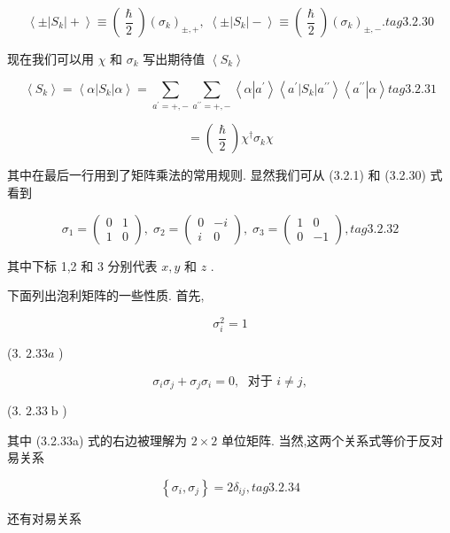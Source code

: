 $$
\left\langle {\pm \left| {S}_{k}\right| + }\right\rangle \equiv \left( \frac{\hslash }{2}\right) {\left( {\sigma }_{k}\right) }_{\pm , + },\;\left\langle {\pm \left| {S}_{k}\right| - }\right\rangle \equiv \left( \frac{\hslash }{2}\right) {\left( {\sigma }_{k}\right) }_{\pm , - }. tag{3. 2.30}
$$

现在我们可以用 $\chi$ 和 ${\sigma }_{k}$ 写出期待值 $\left\langle {S}_{k}\right\rangle$

$$
\left\langle {S}_{k}\right\rangle = \left\langle {\alpha \left| {S}_{k}\right| \alpha }\right\rangle = \mathop{\sum }\limits_{{{a}^{\prime } = + , - }}\mathop{\sum }\limits_{{{a}^{\prime \prime } = + , - }}\left\langle {\alpha \left| {a}^{\prime }\right\rangle \left\langle {{a}^{\prime }\left| {S}_{k}\right| {a}^{\prime \prime }}\right\rangle \left\langle {a}^{\prime \prime }\right| \alpha }\right\rangle tag{3. 2.31}
$$

$$
= \left( \frac{\hslash }{2}\right) {\chi }^{ \dagger }{\sigma }_{k}\chi
$$

其中在最后一行用到了矩阵乘法的常用规则. 显然我们可从 (3.2.1) 和 (3.2.30) 式看到

$$
{\sigma }_{1} = \left( \begin{array}{ll} 0 & 1 \\ 1 & 0 \end{array}\right) ,\;{\sigma }_{2} = \left( \begin{matrix} 0 & - i \\ i & 0 \end{matrix}\right) ,\;{\sigma }_{3} = \left( \begin{matrix} 1 & 0 \\ 0 & - 1 \end{matrix}\right) , tag{3. 2.32}
$$

其中下标 1,2 和 3 分别代表 $x, y$ 和 $z$ .

下面列出泡利矩阵的一些性质. 首先,

$$
{\sigma }_{i}^{2} = 1
$$

(3. ${2.33a}$ )

$$
{\sigma }_{i}{\sigma }_{j} + {\sigma }_{j}{\sigma }_{i} = 0,\;\text{ 对于 }i \neq j,
$$

(3. ${2.33}\mathrm{\;b}$ )

其中 (3.2.33a) 式的右边被理解为 $2 \times 2$ 单位矩阵. 当然,这两个关系式等价于反对易关系

$$
\left\{ {{\sigma }_{i},{\sigma }_{j}}\right\} = 2{\delta }_{ij}, tag{3. 2.34}
$$

还有对易关系

